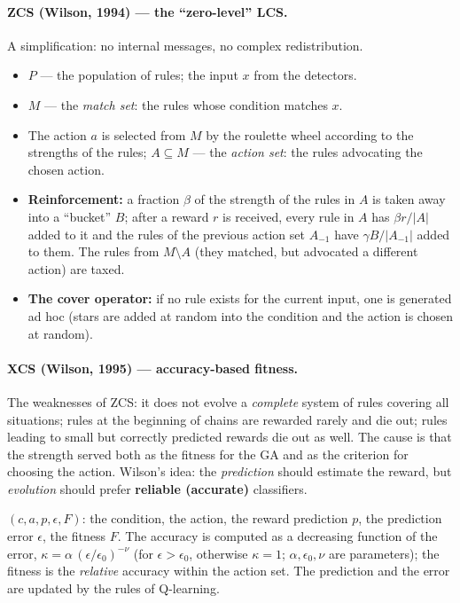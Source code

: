 \documentclass[11pt,a4paper]{article}
\theoremstyle{definition}
\providecommand{\uv}[1]{``#1''}
\begin{document}
\paragraph{ZCS (Wilson, 1994) --- the \uv{zero-level} LCS.} A simplification: no
internal messages, no complex redistribution.
\begin{itemize}
\item $P$ --- the population of rules; the input $x$ from the detectors.
\item $M$ --- the \emph{match set}: the rules whose condition matches $x$.
\item The action $a$ is selected from $M$ by the roulette wheel according to the
  strengths of the rules; $A \subseteq M$ --- the \emph{action set}: the rules
  advocating the chosen action.
\item \textbf{Reinforcement:} a fraction $\beta$ of the strength of the rules in
  $A$ is taken away into a \uv{bucket} $B$; after a reward $r$ is received, every
  rule in $A$ has $\beta r/|A|$ added to it and the rules of the previous action
  set $A_{-1}$ have $\gamma B/|A_{-1}|$ added to them. The rules from
  $M \setminus A$ (they matched, but advocated a different action) are taxed.
\item \textbf{The cover operator:} if no rule exists for the current input, one
  is generated ad hoc (stars are added at random into the condition and the
  action is chosen at random).
\end{itemize}

\paragraph{XCS (Wilson, 1995) --- accuracy-based fitness.}
The weaknesses of ZCS: it does not evolve a \emph{complete} system of rules
covering all situations; rules at the beginning of chains are rewarded rarely
and die out; rules leading to small but correctly predicted rewards die out as
well. The cause is that the strength served both as the fitness for the GA and
as the criterion for choosing the action. Wilson's idea: the \emph{prediction}
should estimate the reward, but \emph{evolution} should prefer
\textbf{reliable (accurate)} classifiers.

\begin{defbox}
$(c, a, p, \epsilon, F)$: the condition, the action, the reward prediction $p$,
the prediction error $\epsilon$, the fitness $F$. The accuracy is computed as a
decreasing function of the error,
$\kappa = \alpha\,(\epsilon/\epsilon_0)^{-\nu}$ (for $\epsilon > \epsilon_0$,
otherwise $\kappa = 1$; $\alpha, \epsilon_0, \nu$ are parameters);
the fitness is the \emph{relative} accuracy within the action set.
The prediction and the error are updated by the rules of Q-learning.
\end{defbox}
\end{document}
